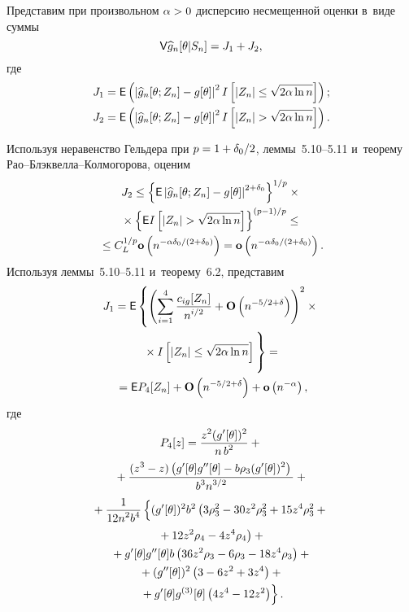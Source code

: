 \begin{multicols}{2}
 \Do
   Представим при произвольном $\alpha\hm>0$ дисперсию несмещенной оценки в~виде суммы
 \begin{equation}
 {\sf V} \widehat{g}_n[\theta|S_n]=J_1+J_2,
 \label{T:7.1-2}
 \end{equation}
 где
 \begin{align*}
  J_1& = \Ep \left(\left|\widehat{g}_n[\theta;Z_n]-g[\theta] \right|^2
  I\left[|Z_n|\le \sqrt{2\alpha\ln n}\right]\right);
\\
  J_2& =\Ep \left(\left|\widehat{g}_n[\theta;Z_n]-g[\theta] \right|^2
  I\left[|Z_n|> \sqrt{2\alpha\ln n}\right]\right).
 \end{align*}

 Используя неравенство Гельдера при $p\hm=1\hm+\delta_0/2$, леммы~5.10--5.11 и~теорему Рао--Блэк\-вел\-ла--Кол\-мо\-го\-ро\-ва, оценим
 \begin{multline}
 J_2\le \left\{\Ep \left|
  \widehat{g}_n[\theta;Z_n]-g[\theta] \right|^{2+\delta_0}\right\}^{1/p}\times{}\\
  {}\times
 \left\{\Ep I\left[|Z_n|> \sqrt{2\alpha\ln n}\right]\right\}^{(p-1)/p}\le{}
\\
{} \le
 C_L^{1/p} \mathbf{o}\left(n^{-\alpha\delta_0/(2+\delta_0)}\right)
  =\mathbf{o}\left(n^{-\alpha\delta_0/(2+\delta_0)}\right).
 \label{T:7.1-3}
 \end{multline}
  Используя леммы~5.10--5.11 и~теорему~6.2, представим
 \begin{multline}
 J_1 =\Ep \left\{\left( \sum\limits_{i=1}^4 \fr{c_{ig}[Z_n]}{n^{i/2}}+
 \Op\left(n^{-5/2+\delta}\right)\right)^2\times{}\right.\\
\left. {}\times
  I\left[|Z_n|\le \sqrt{2\alpha\ln n}\right]
  \vphantom{\left(\sum\limits_{i=1}^4\right)^2}\right\} ={}
\\
  {}=\Ep P_4[Z_n]+\Op\left(n^{-5/2+\delta}\right)+\op\left(n^{-\alpha}\right),
  \label{T:7.1-4}
 \end{multline}
 где
  \begin{multline*}
  P_4[z]=\fr{z^2 (g'[\theta])^2}{n\,b^2}
  +{}\\
  {}+\fr{(z^3-z)\left(
  g'[\theta] g''[\theta]-b \rho _3 (g'[\theta])^2\right)}{b^3 n^{3/2}}+{}
\\
 {}+\fr{1}{12n^2 b^4}\left\{
 \vphantom{+g'[\theta] g^{(3)}[\theta]\left(
  4 z^4-12 z^2 \right)}
 (g'[\theta])^2 b^2 \left(
  3 \rho _3^2-30 z^2 \rho _3^2+15 z^4 \rho _3^2
  +{}\right.\right.\\
\left.  {}+12 z^2 \rho _4 -4 z^4 \rho _4\right)+{}
 \\
  {}+g'[\theta] g''[\theta] b\left(36 z^2 \rho_3
  -6 \rho_3-18 z^4 \rho_3\right)+{}\\
  {}+
  (g''[\theta])^2\left(3-6 z^2+3 z^4 \right)+{}
\\
\left.{}  +g'[\theta] g^{(3)}[\theta]\left(
  4 z^4-12 z^2 \right)\right\}.
 \end{multline*}


\end{multicols}
